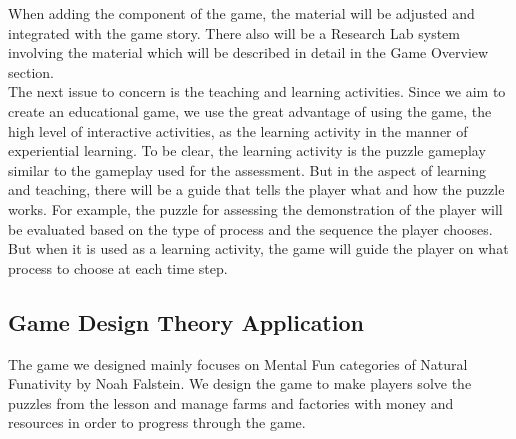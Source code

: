 \documentclass[12pt,oneside,openright,a4paper]{cpe-english-project}
\begin{document}
\begin{itemize}
	When adding the component of the game, the material will be adjusted and integrated with the game story. There also will be a Research Lab system involving the material which will be described in detail in the Game Overview section. \\
	The next issue to concern is the teaching and learning activities. Since we aim to create an educational game, we use the great advantage of using the game, the high level of interactive activities, as the learning activity in the manner of experiential learning. To be clear, the learning activity is the puzzle gameplay similar to the gameplay used for the assessment. But in the aspect of learning and teaching, there will be a guide that tells the player what and how the puzzle works. For example, the puzzle for assessing the demonstration of the player will be evaluated based on the type of process and the sequence the player chooses. But when it is used as a learning activity, the game will guide the player on what process to choose at each time step.

\end{itemize}

\subsection{Game Design Theory Application}
%
\hspace{2em}The game we designed mainly focuses on Mental Fun categories of Natural Funativity by Noah Falstein. We design the game to make players solve the puzzles from the lesson and manage farms and factories with money and resources in order to progress through the game.
\end{document}
